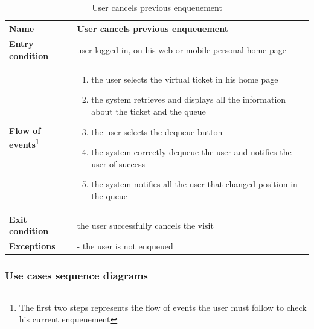 \begin{table}[h!]
    \centering
    \begin{tabular}{@{}P{0.2\textwidth}P{0.70\textwidth}@{}}
        \toprule
        \textbf{Name}                 & User cancels previous enqueuement\\
        \midrule
        \textbf{Entry condition}      & user logged in, on his web or mobile personal home page\\
        \textbf{Flow of events}\footnote{The first two steps represents the flow of events the user must follow to check his current enqueuement}       & 
        \begin{enumerate}[nolistsep, leftmargin=*]
            \item the user selects the virtual ticket in his home page
            \item the system retrieves and displays all the information about the ticket and the queue
            \item the user selects the dequeue button
            \item the system correctly dequeue the user and notifies the user of success
            \item the system notifies all the user that changed position in the queue
        \end{enumerate} \\
        \textbf{Exit condition}       & the user successfully cancels the visit\\
        \textbf{Exceptions}           
        & - the user is not enqueued\\
        \bottomrule
    \end{tabular}
\caption{User cancels previous enqueuement}
\label{table:usercnacelspreviousenquement}
\end{table}

\clearpage

\subsubsection{Use cases sequence diagrams}

